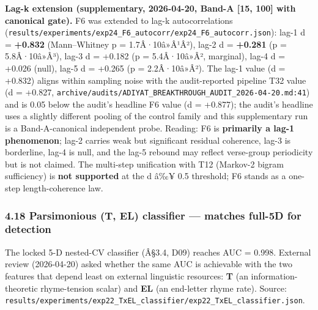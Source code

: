 \documentclass[
]{article}
\begin{document}
\textbf{Lag-k extension (supplementary, 2026-04-20, Band-A {[}15, 100{]}
with canonical gate).} F6 was extended to lag-k autocorrelations
(\texttt{results/experiments/exp24\_F6\_autocorr/exp24\_F6\_autocorr.json}):
lag-1 d = \textbf{+0.832} (Mann--Whitney p = 1.7Â·10â»Â¹Â²), lag-2 d =
\textbf{+0.281} (p = 5.8Â·10â»Â³), lag-3 d = +0.182 (p = 5.4Â·10â»Â²,
marginal), lag-4 d = +0.026 (null), lag-5 d = +0.265 (p = 2.2Â·10â»Â²).
The lag-1 value (d = +0.832) aligns within sampling noise with the
audit-reported pipeline T32 value (d = +0.827,
\texttt{archive/audits/ADIYAT\_BREAKTHROUGH\_AUDIT\_2026-04-20.md:41})
and is 0.05 below the audit's headline F6 value (d = +0.877); the
audit's headline uses a slightly different pooling of the control family
and this supplementary run is a Band-A-canonical independent probe.
Reading: F6 is \textbf{primarily a lag-1 phenomenon}; lag-2 carries weak
but significant residual coherence, lag-3 is borderline, lag-4 is null,
and the lag-5 rebound may reflect verse-group periodicity but is not
claimed. The multi-step unification with T12 (Markov-2 bigram
sufficiency) is \textbf{not supported} at the d â‰¥ 0.5 threshold; F6
stands as a one-step length-coherence law.

\subsubsection{4.18 Parsimonious (T, EL) classifier --- matches full-5D
for
detection}\label{parsimonious-t-el-classifier-matches-full-5d-for-detection}

The locked 5-D nested-CV classifier (Â§3.4, D09) reaches AUC = 0.998.
External review (2026-04-20) asked whether the same AUC is achievable
with the two features that depend least on external linguistic
resources: \textbf{T} (an information-theoretic rhyme-tension scalar)
and \textbf{EL} (an end-letter rhyme rate). Source:
\texttt{results/experiments/exp22\_TxEL\_classifier/exp22\_TxEL\_classifier.json}.
\end{document}

